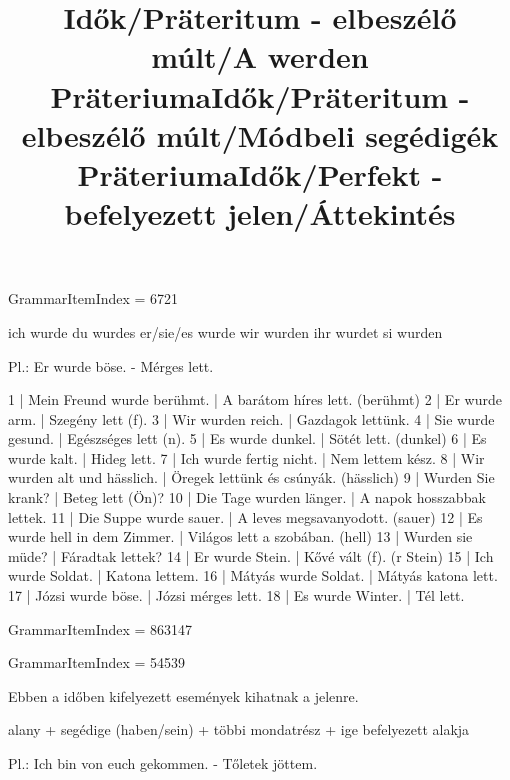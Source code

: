 \title{Idők/Präteritum - elbeszélő múlt/A werden Präteriuma}

GrammarItemIndex = 6721

\begin{desc}
ich wurde
du wurdes
er/sie/es wurde
wir wurden
ihr wurdet
si wurden

Pl.: Er wurde böse. - Mérges lett.
\end{desc}

\begin{exmp}
1 | Mein Freund wurde berühmt. | A barátom híres lett. (berühmt)
2 | Er wurde arm. | Szegény lett (f).
3 | Wir wurden reich. | Gazdagok lettünk.
4 | Sie wurde gesund. | Egészséges lett (n).
5 | Es wurde dunkel. | Sötét lett. (dunkel)
6 | Es wurde kalt. | Hideg lett.
7 | Ich wurde fertig nicht. | Nem lettem kész.
8 | Wir wurden alt und hässlich. | Öregek lettünk és csúnyák. (hässlich)
9 | Wurden Sie krank? | Beteg lett (Ön)?
10 | Die Tage wurden länger. | A napok hosszabbak lettek.
11 | Die Suppe wurde sauer. | A leves megsavanyodott. (sauer)
12 | Es wurde hell in dem Zimmer. | Világos lett a szobában. (hell)
13 | Wurden sie müde? | Fáradtak lettek?
14 | Er wurde Stein. | Kővé vált (f). (r Stein)
15 | Ich wurde Soldat. | Katona lettem.
16 | Mátyás wurde Soldat. | Mátyás katona lett.
17 | Józsi wurde böse. | Józsi mérges lett.
18 | Es wurde Winter. | Tél lett.
\end{exmp}

\title{Idők/Präteritum - elbeszélő múlt/Módbeli segédigék Präteriuma}

GrammarItemIndex = 863147

\begin{desc}
\end{desc}

\begin{exmp}
\end{exmp}

\title{Idők/Perfekt - befelyezett jelen/Áttekintés}

GrammarItemIndex = 54539

\begin{desc}
Ebben a időben kifelyezett események kihatnak a jelenre.
\begin{center}
alany + segédige (haben/sein) + többi mondatrész + ige befelyezett alakja
\end{center}

Pl.: Ich bin von euch gekommen. - Tőletek jöttem.
\end{desc}

\begin{exmp}
\end{exmp}

